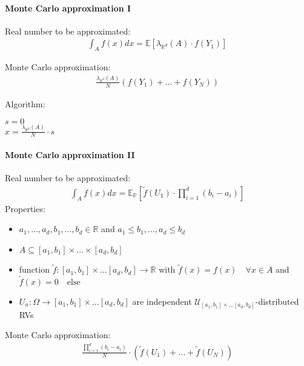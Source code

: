 \documentclass[a4paper,landscape,7pt,fleqn]{scrartcl}
\begin{document}
\begin{multicols*}{3}
\paragraph{Monte Carlo approximation I}

Real number to be approximated:
\begin{align*}
\int_A f(x) dx = \mathbb{E}[\lambda_{\mathbb{R}^d}(A) \cdot f(Y_1)]
\end{align*}

Monte Carlo approximation:
\begin{align*}
\frac{\lambda_{\mathbb{R}^d}(A)}{N} (f(Y_1) + \ldots + f(Y_N))
\end{align*}

Algorithm:
\begin{algorithm}[H]
$s = 0$ \\
$x = \frac{\lambda_{\mathbb{R}^d}(A)}{N} \cdot s$
\end{algorithm}

\paragraph{Monte Carlo approximation II}

Real number to be approximated:
\begin{align*}
\int_A f(x) dx = \mathbb{E}_\mathbb{P} \left[ \tilde f(U_1) \cdot \prod_{i=1}^d (b_i - a_i) \right]
\end{align*}
Properties:
\begin{itemize}
\item $a_1, \ldots, a_d, b_1, \ldots, b_d \in \mathbb{R}$ and $a_1 \leq b_1, \ldots, a_d \leq b_d$
\item $A \subseteq [a_1,b_1] \times \ldots \times [a_d,b_d]$
\item function $\tilde f: [a_1,b_1] \times \ldots [a_d,b_d] \rightarrow \mathbb{R}$ with $\tilde f(x) = f(x) \quad \forall x \in A$ and $\tilde f(x) = 0 \quad \text{else}$
\item $U_n: \Omega \rightarrow [a_1,b_1] \times \ldots [a_d,b_d]$ are independent $\mathcal{U}_{[a_1,b_1] \times \ldots [a_d,b_d]}$-distributed RVs
\end{itemize}

Monte Carlo approximation:
\begin{align*}
\frac{\prod_{i=1}^d(b_i - a_i)}{N} \cdot \left( \tilde f(U_1) + \ldots + \tilde f(U_N) \right)
\end{align*}


\end{multicols*}
\end{document}
